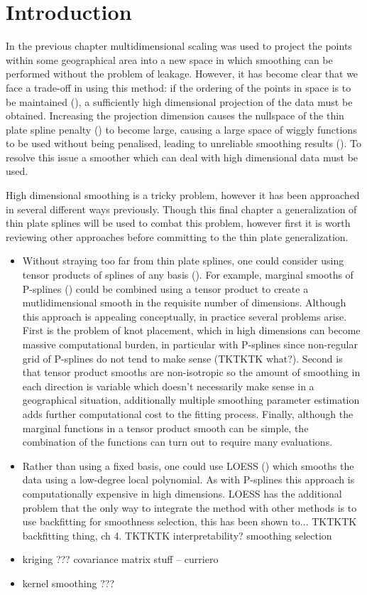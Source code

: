 
\label{chap-gds}


\section{Introduction}

In the previous chapter multidimensional scaling was used to project the points within some geographical area into a new space in which smoothing can be performed without the problem of leakage. However, it has become clear that we face a trade-off in using this method: if the ordering of the points in space is to be maintained (), a sufficiently high dimensional projection of the data must be obtained. Increasing the projection dimension causes the nullspace of the thin plate spline penalty () to become large, causing a large space of wiggly functions to be used without being penalised, leading to unreliable smoothing results (). To resolve this issue a smoother which can deal with high dimensional data must be used. 

High dimensional smoothing is a tricky problem, however it has been approached in several different ways previously. Though this final chapter a generalization of thin plate splines will be used to combat this problem, however first it is worth reviewing other approaches before committing to the thin plate generalization.
\begin{itemize}
   \item Without straying too far from thin plate splines, one could consider using tensor products of splines of any basis (). For example, marginal smooths of P-splines () could be combined using a tensor product to create a mutlidimensional smooth in the requisite number of dimensions. Although this approach is appealing conceptually, in practice several problems arise. First is the problem of knot placement, which in high dimensions can become massive computational burden, in particular with P-splines since non-regular grid of P-splines do not tend to make sense (TKTKTK what?). Second is that tensor product smooths are non-isotropic so the amount of smoothing in each direction is variable which doesn't necessarily make sense in a geographical situation, additionally multiple smoothing parameter estimation adds further computational cost to the fitting process. Finally, although the marginal functions in a tensor product smooth can be simple, the combination of the functions can turn out to require many evaluations.
   \item Rather than using a fixed basis, one could use LOESS (\cite{loess2}) which smooths the data using a low-degree local polynomial. As with P-splines this approach is computationally expensive in high dimensions. LOESS has the additional problem that the only way to integrate the method with other methods is to use backfitting for smoothness selection, this has been shown to... TKTKTK backfitting thing, ch 4. TKTKTK interpretability?
         smoothing selection
   \item kriging ???
         covariance matrix stuff -- curriero
   \item kernel smoothing ???
\end{itemize}

